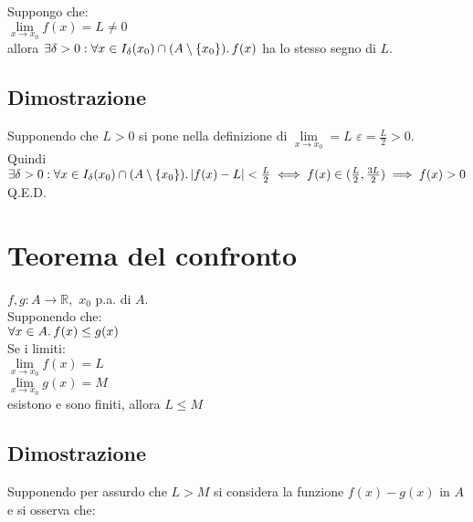 \documentclass[a4paper, twoside, italian, 11pt]{book}
\newcommand{\braces}[1] {\left \{ #1 \right \}}
\newcommand{\abs}[1] {\left | #1 \right |}
\newcommand{\R}{\mathbb{R}}
\begin{document}
\noindent
Suppongo che: \\

\noindent
$\lim\limits_{x \to x_0} f(x) = L \neq 0$ \\

\noindent
allora $\exists \delta > 0 : \forall x \in I_\delta(x_0) \cap (A \setminus \braces{x_0}) \ldotp f(x)$ ha lo stesso segno di $L$.


\subsection{Dimostrazione}

\noindent
Supponendo che $L > 0$ si pone nella definizione di $\lim\limits_{x \to x_0} = L$ $\varepsilon = \frac{L}{2} > 0$. \\

\noindent
Quindi $\exists \delta > 0 : \forall x \in I_\delta(x_0) \cap (A \setminus \braces{x_0}) \ldotp \abs{f(x) - L} < \frac{L}{2} \iff f(x) \in (\frac{L}{2}, \frac{3L}{2}) \implies f(x) > 0$ \\

\noindent Q.E.D.


\section{Teorema del confronto}

\noindent
$f, g : A \rightarrow \R,$ $x_0$ p.a. di $A$. \\

\noindent
Supponendo che: \\

$\forall x \in A \ldotp f(x) \leq g(x)$ \\

\noindent
Se i limiti: \\

$\lim\limits_{x \to x_0} f(x) = L$ \\
\indent
$\lim\limits_{x \to x_0} g(x) = M$ \\

\noindent
esistono e sono finiti, allora $L \leq M$


\subsection{Dimostrazione}

\noindent
Supponendo per assurdo che $L > M$ si considera la funzione $f(x) - g(x)$ in $A$ e si osserva che: \\
\end{document}
